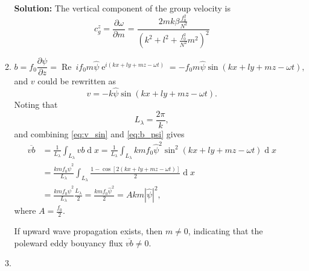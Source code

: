 \documentclass[a4paper]{article}
\begin{document}
\begin{enumerate}[label=\textbf{\arabic*.}]
\begin{enumerate}[label=\textbf{(\alph*)}]
			\textbf{Solution:} The vertical component of the group velocity is
			$$c_g^z = \frac{\partial \omega}{\partial m}=\frac{2mk\beta\frac{f_0^2}{N^2}}{\left(k^2+l^2+\frac{f_0^2}{N^2}m^2\right)^2}$$
			\item 
			\begin{equation}\label{eq:b_psi}
				b =f_0\frac{\partial \psi}{\partial z}=\operatorname{Re} ~if_0m\hat{\psi}\operatorname{e}^{i(kx+ly+mz-\omega t)}=-f_0m\hat{\psi}\operatorname{sin}(kx+ly+mz-\omega t),
			\end{equation}
			and $v$ could be rewritten as 
			\begin{equation} \label{eq:v_sin}
				v = -k\hat{\psi}\operatorname{sin}(kx+ly+mz-\omega t).
			\end{equation}
			Noting that
			$$L_\lambda = \frac{2\pi}{k},$$
			and combining \eqref{eq:v_sin} and \eqref{eq:b_psi} gives
			\begin{align*} 
			\overline{vb}&=\frac{1}{L_\lambda}\int_{L_\lambda}vb\operatorname{d}x=\frac{1}{L_\lambda}\int_{L_\lambda}kmf_0\hat{\psi}^2\operatorname{sin}^2(kx+ly+mz-\omega t)\operatorname{d}x\\
				&=\frac{kmf_0\hat{\psi}^2}{L_\lambda}\int_{L_\lambda}\frac{1-\operatorname{cos}[2(kx+ly+mz-\omega t)]}{2}\operatorname{d}x\\
				& = \frac{kmf_0\hat{\psi}^2}{L_\lambda}\frac{L_\lambda}{2}= \frac{kmf_0\hat{\psi}^2}{2} = Akm|\hat{\psi}|^2,
			\end{align*}
			where $A=\frac{f_0}{2}.$
			
			If upward wave propagation exists, then $m\neq 0$, indicating that the poleward eddy bouyancy flux $\overline{vb}\neq 0$.\\
			
			\item %
			

\end{enumerate}
\end{enumerate}
\end{document}
